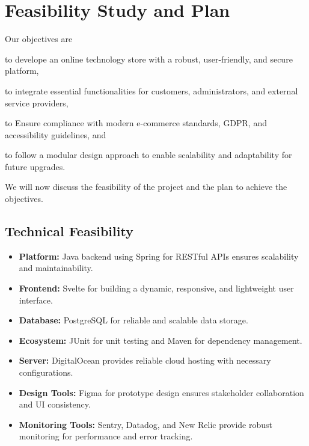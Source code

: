 \documentclass[a4paper,journal]{IEEEtran}
\begin{document}

\section{Feasibility Study and Plan}
Our objectives are
\begin{enumerate*}
  \item to develope an online technology store with a robust, user-friendly,
    and secure platform,
  \item to integrate essential functionalities for customers, administrators,
    and external service providers,
  \item to Ensure compliance with modern e-commerce standards, GDPR, and
    accessibility guidelines, and
  \item to follow a modular design approach to enable scalability and
    adaptability for future upgrades.
\end{enumerate*}

We will now discuss the feasibility of the project and the plan to achieve the
objectives.

\subsection{Technical Feasibility}
\begin{itemize}
  \item \textbf{Platform:} Java backend using Spring for RESTful APIs
    ensures scalability and maintainability.
  \item \textbf{Frontend:} Svelte for building a dynamic, responsive, and
    lightweight user interface.
  \item \textbf{Database:} PostgreSQL for reliable and scalable data storage.
  \item \textbf{Ecosystem:} JUnit for unit testing and Maven for dependency
    management.
  \item \textbf{Server:} DigitalOcean provides reliable cloud hosting with
    necessary configurations.
  \item \textbf{Design Tools:} Figma for prototype design ensures stakeholder
    collaboration and UI consistency.
  \item \textbf{Monitoring Tools:} Sentry, Datadog, and New Relic provide robust
    monitoring for performance and error tracking.
\end{itemize}
\end{document}
